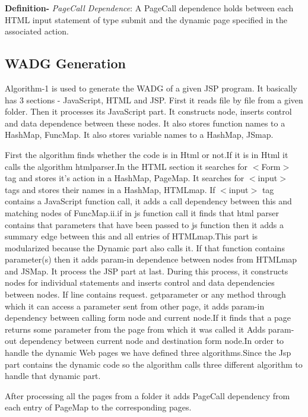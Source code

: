 \documentclass[11pt]{article}   %
\begin{document}
{\textbf{Definition-}} \emph{PageCall Dependence}: A PageCall dependence holds between each HTML input statement of type submit and the dynamic page specified in the associated action.

\subsection{WADG Generation}
Algorithm-1 is used to generate the WADG of a given JSP program. It basically has 3 sections - JavaScript, HTML and JSP. First it reads file by file from a given folder. Then it processes its JavaScript part. It constructs node, inserts control and data dependence between these nodes. It also stores  function names to a HashMap, FuncMap. It also stores variable names to a HashMap, JSmap.

First the algorithm finds whether the code is in Html or not.If it is in Html it calls the algorithm htmlparser.In the HTML section it searches for $<$Form$>$ tag and stores it's action in a HashMap, PageMap. It searches for $<$input$>$ tags and stores their names in a HashMap, HTMLmap. If $<$input$>$ tag contains a JavaScript function call, it adds a call dependency between this and matching nodes of FuncMap.ii.if in js function call it finds that html parser contains that parameters that have been passed to js function then it adds a summary edge between this and all entries of HTMLmap.This part is modularized because the Dynamic part also calls it. 
If that function contains parameter(s) then it adds param-in dependence between nodes from HTMLmap and JSMap. It process the JSP part at last. During this process, it constructs nodes for individual statements and inserts control and data dependencies between nodes. If line contains request.
getparameter or any method through which it can access a parameter sent from other page, it adds param-in dependency
between calling form node and current node.If it finds that a page returns some parameter from the page from which it was called it Adds param-out dependency between current node and destination form node.In order to handle the dynamic Web pages we have defined three algorithms.Since the Jsp part contains the dynamic code so the algorithm calls three different algorithm to handle that dynamic part.

After processing all the pages from a folder it adds PageCall dependency from each entry of PageMap to the corresponding pages.
\end{document}
